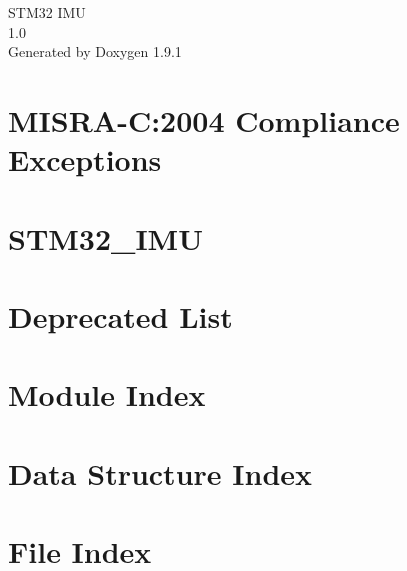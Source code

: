 \let\mypdfximage\pdfximage\def\pdfximage{\immediate\mypdfximage}\documentclass[twoside]{book}
\newcommand{\+}{\discretionary{\mbox{\scriptsize$\hookleftarrow$}}{}{}}
\newcommand{\clearemptydoublepage}{%
  \newpage{\pagestyle{empty}\cleardoublepage}%
}
\begin{document}
\raggedbottom

\hypersetup{pageanchor=false,
             bookmarksnumbered=true,
             pdfencoding=unicode
            }
\begin{titlepage}
\vspace*{7cm}
\begin{center}%
{\Large STM32 IMU \\[1ex]\large 1.\+0 }\\
\vspace*{1cm}
{\large Generated by Doxygen 1.9.1}\\
\end{center}
\end{titlepage}
\clearemptydoublepage
{}
\tableofcontents
\clearemptydoublepage
{}
\hypersetup{pageanchor=true}

\chapter{MISRA-\/C\+:2004 Compliance Exceptions}
\label{CMSIS_MISRA_Exceptions}

\chapter{STM32\+\_\+\+IMU}
\label{md_README}

\chapter{Deprecated List}
\label{deprecated}

\chapter{Module Index}

\chapter{Data Structure Index}

\chapter{File Index}

\end{document}
